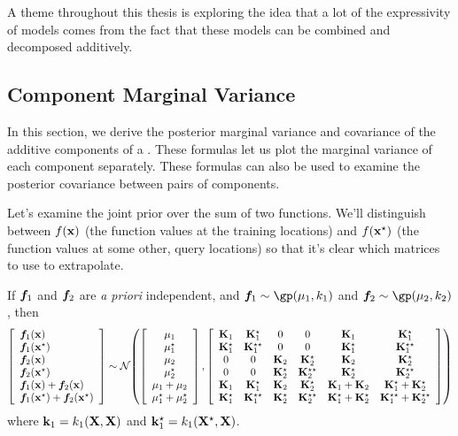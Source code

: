 A theme throughout this thesis is exploring the idea that a lot of the expressivity of \gp{} models comes from the fact that these models can be combined and decomposed additively.


\subsection{Component Marginal Variance}

In this section, we derive the posterior marginal variance and covariance of the additive components of a \gp{}.  These formulas let us plot the marginal variance of each component separately.  These formulas can also be used to examine the posterior covariance between pairs of components.


Let's examine the joint prior over the sum of two functions.
We'll distinguish between $f({\bf{x}})$ (the function values at the training locations) and  $f({\bf{x}}^\star)$ (the function values at some other, query locations) so that it's clear which matrices to use to extrapolate.

If $\boldsymbol{f}_1$ and $\boldsymbol{f}_2$ are \emph{a priori} independent, and $\vf_1 \sim \gp( \vmu_1, k_1)$ and $\vf_2 \sim \gp( \vmu_2, k_2)$, then
%
\begin{align}
\left[ \begin{array}{l} 
\boldsymbol{f}_1({\bf{x}}) \\
\boldsymbol{f}_1({\bf{x}}^\star) \\
\boldsymbol{f}_2({\bf{x}}) \\
\boldsymbol{f}_2({\bf{x}}^\star) \\
\boldsymbol{f}_1({\bf{x}}) + \boldsymbol{f}_2({\bf{x}}) \\
\boldsymbol{f}_1({\bf{x}}^\star) + \boldsymbol{f}_2({\bf{x}}^\star)
\end{array} \right]
\sim
\mathcal{N}\!\left(
\left[ \begin{array}{c} {\bf{\mu}}_1 \\ {\bf{\mu}}_1^\star \\ {\bf{\mu}}_2 \\ {\bf{\mu}}_2^\star \\ {\bf{\mu}}_1 + {\bf{\mu}}_2 \\ {\bf{\mu}}_1^\star + {\bf{\mu}}_2^\star \end{array} \right]
,\left[ \begin{array}{cccccc} 
\mathbf{K}_1 & \mathbf{K}_1^\star & 0 & 0 & \mathbf{K}_1 & \mathbf{K}_1^\star \\ 
\mathbf{K}_1^\star & \mathbf{K}_1^{\star\star} & 0 & 0 & \mathbf{K}_1^\star & \mathbf{K}_1^{\star\star} \\
0 & 0 & \mathbf{K}_2 & \mathbf{K}_2^\star & \mathbf{K}_2 & \mathbf{K}_2^\star \\ 
0 & 0 & \mathbf{K}_2^\star & \mathbf{K}_2^{\star\star} & \mathbf{K}_2^\star & \mathbf{K}_2^{\star\star} \\
\mathbf{K}_1 & \mathbf{K}_1^\star & \mathbf{K}_2 & \mathbf{K}_2^\star & \mathbf{K}_1 + \mathbf{K}_2 & \mathbf{K}_1^\star + \mathbf{K}_2^\star \\ 
\mathbf{K}_1^\star & \mathbf{K}_1^{\star\star}  & \mathbf{K}_2^\star & \mathbf{K}_2^{\star\star}  & \mathbf{K}_1^\star + \mathbf{K}_2^\star & \mathbf{K}_1^{\star\star} + \mathbf{K}_2^{\star\star}\\
\end{array} \right]
\right)
\end{align}
%
where ${\bf{k}}_1 = k_1( \mathbf{X}, \mathbf{X} )$ and ${\bf{k}}_1^\star = k_1( \mathbf{X}^\star, \mathbf{X} )$. 

